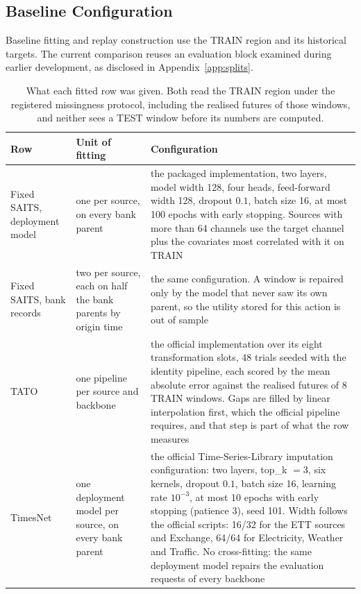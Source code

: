 \documentclass{article}
\begin{document}
\subsection{Baseline Configuration}
\label{app:baseline-config}
Baseline fitting and replay construction use the TRAIN region and its historical targets.
The current comparison reuses an evaluation block examined during earlier development, as
disclosed in Appendix~\ref{app:splits}.

\begin{table}[htbp]
  \caption{What each fitted row was given. Both read the TRAIN region under the registered
  missingness protocol, including the realised futures of those windows, and neither sees a
  TEST window before its numbers are computed.}
  \label{tab:app-baselinecfg}
  \centering
  \small
  \setlength{\tabcolsep}{4pt}
\begin{tabular}{@{}p{} p{} p{}@{}}
    \toprule
    Row & Unit of fitting & Configuration \\
    \midrule
    Fixed SAITS, deployment model & one per source, on every bank parent & the packaged implementation, two layers, model width 128, four heads, feed-forward width 128, dropout $0.1$, batch size 16, at most 100 epochs with early stopping. Sources with more than 64 channels use the target channel plus the covariates most correlated with it on TRAIN \\
    Fixed SAITS, bank records & two per source, each on half the bank parents by origin time & the same configuration. A window is repaired only by the model that never saw its own parent, so the utility stored for this action is out of sample \\
    TATO & one pipeline per source and backbone & the official implementation over its eight transformation slots, 48 trials seeded with the identity pipeline, each scored by the mean absolute error against the realised futures of 8 TRAIN windows. Gaps are filled by linear interpolation first, which the official pipeline requires, and that step is part of what the row measures \\
    TimesNet & one deployment model per source, on every bank parent & the official Time-Series-Library imputation configuration: two layers, top\_k $=3$, six kernels, dropout $0.1$, batch size 16, learning rate $10^{-3}$, at most 10 epochs with early stopping (patience 3), seed 101. Width follows the official scripts: 16/32 for the ETT sources and Exchange, 64/64 for Electricity, Weather and Traffic. No cross-fitting: the same deployment model repairs the evaluation requests of every backbone \\
    \bottomrule
  \end{tabular}
\end{table}
\end{document}
